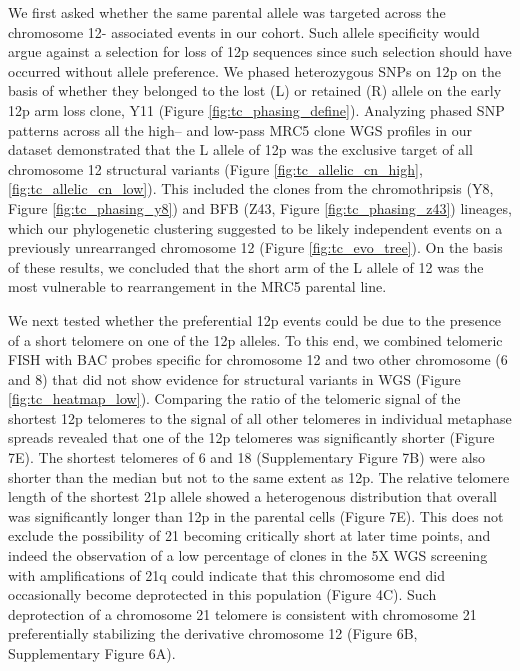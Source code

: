 \documentclass[phd,tocprelim]{cornell}
\begin{document}
We first asked whether the same parental allele was targeted across the chromosome 12- associated events in our cohort. Such allele specificity would argue against a selection for loss of 12p sequences since such selection should have occurred without allele preference. We phased heterozygous SNPs on 12p on the basis of whether they belonged to the lost (L) or retained (R) allele on the early 12p arm loss clone, Y11 (Figure \ref{fig:tc_phasing_define}). Analyzing phased SNP patterns across all the high– and low-pass MRC5 clone WGS profiles in our dataset demonstrated that the L allele of 12p was the exclusive target of all chromosome 12 structural variants (Figure \ref{fig:tc_allelic_cn_high}, \ref{fig:tc_allelic_cn_low}). This included the clones from the chromothripsis (Y8, Figure \ref{fig:tc_phasing_y8}) and BFB (Z43, Figure \ref{fig:tc_phasing_z43}) lineages, which our phylogenetic clustering suggested to be likely independent events on a previously unrearranged chromosome 12 (Figure \ref{fig:tc_evo_tree}). On the basis of these results, we concluded that the short arm of the L allele of 12 was the most vulnerable to rearrangement in the MRC5 parental line.

We next tested whether the preferential 12p events could be due to the presence of a short telomere on one of the 12p alleles. To this end, we combined telomeric FISH with BAC probes specific for chromosome 12 and two other chromosome (6 and 8) that did not show evidence for structural variants in WGS (Figure \ref{fig:tc_heatmap_low}). Comparing the ratio of the telomeric signal of the shortest 12p telomeres to the signal of all other telomeres in individual metaphase spreads revealed that one of the 12p telomeres was significantly shorter (Figure 7E). The shortest telomeres of 6 and 18 (Supplementary Figure 7B) were also shorter than the median but not to the same extent as 12p. The relative telomere length of the shortest 21p allele showed a heterogenous distribution that overall was significantly longer than 12p in the parental cells (Figure 7E). This does not exclude the possibility of 21 becoming critically short at later time points, and indeed the observation of a low percentage of clones in the 5X WGS screening with amplifications of 21q could indicate that this chromosome end did occasionally become deprotected in this population (Figure 4C). Such deprotection of a chromosome 21 telomere is consistent with chromosome 21 preferentially stabilizing the derivative chromosome 12 (Figure 6B, Supplementary Figure 6A).
\end{document}
